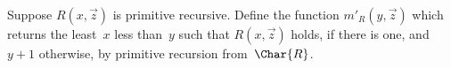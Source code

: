\documentclass[../../../include/open-logic-section]{subfiles}
\begin{document}
\begin{prob}
Suppose $R(x, \vec z)$ is primitive recursive. Define the function
$m'_R(y, \vec{z})$ which returns the least~$x$ less than~$y$ such that
$R(x,\vec{z})$ holds, if there is one, and $y+1$ otherwise, by
primitive recursion from~$\Char{R}$.
\end{prob}
\end{document}
